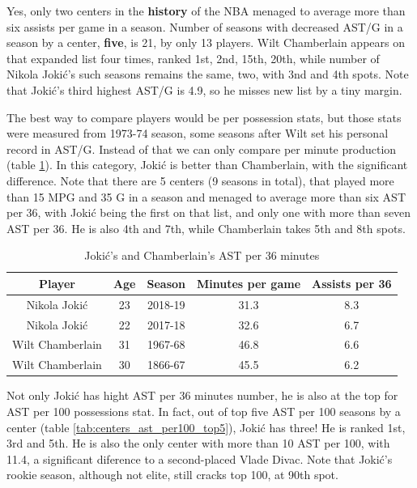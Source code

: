 \documentclass[a4paper]{article}
\begin{document}
Yes, only two centers in the \textbf{history} of the NBA menaged to average more than six assists per game in a season. Number of seasons with decreased AST/G in a season by a center, \textbf{five}, is 21, by only 13 players. Wilt Chamberlain appears on that expanded list four times, ranked 1st, 2nd, 15th, 20th, while number of Nikola Joki\' c's such seasons remains the same, two, with 3nd and 4th spots. Note that Joki\' c's third highest AST/G is 4.9, so he misses new list by a tiny margin.

The best way to compare players would be per possession stats, but those stats were measured from 1973-74 season, some seasons after Wilt set his personal record in AST/G. Instead of that we can only compare per minute production (table \ref{tab:jokic_wilt_per_36}). In this category, Joki\' c is better than Chamberlain, with the significant difference. Note that there are 5 centers (9 seasons in total), that played more than 15 MPG and 35 G in a season and menaged to average more than six AST per 36, with Joki\' c being the first on that list, and only one with more than seven AST per 36. He is also 4th and 7th, while Chamberlain takes 5th and 8th spots.

\begin{table}[h!]
\begin{center}
\begin{tabular}{|c|c|c|c|c|} \hline
\textbf{Player} & \textbf{Age} & \textbf{Season} & \textbf{Minutes per game} & \textbf{Assists per 36} \\ \hline
Nikola Jokić & 23 & 2018-19 & 31.3 & 8.3 \\ \hline
Nikola Jokić & 22 & 2017-18 & 32.6 & 6.7 \\ \hline
Wilt Chamberlain & 31 & 1967-68 & 46.8 & 6.6 \\ \hline
Wilt Chamberlain & 30 & 1866-67 & 45.5 & 6.2 \\ \hline
\end{tabular}
\caption{Joki\' c's and Chamberlain's AST per 36 minutes}
\label{tab:jokic_wilt_per_36}
\end{center}
\end{table} 

Not only Joki\' c has hight AST per 36 minutes number, he is also at the top for AST per 100 possessions stat. In fact, out of top five AST per 100 seasons by a center (table \ref{tab:centers_ast_per100_top5}), Joki\' c has three! He is ranked 1st, 3rd and 5th. He is also the only center with more than 10 AST per 100, with 11.4, a significant diference to a second-placed Vlade Divac. Note that Joki\' c's rookie season, although not elite, still cracks top 100, at 90th spot.
\end{document}
